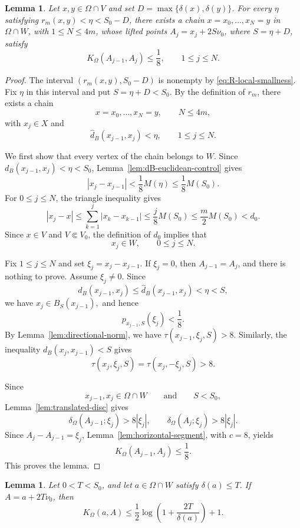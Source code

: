 \documentclass[11pt]{article}
\newtheorem{lemma}[theorem]{Lemma}
\theoremstyle{definition}
\begin{document}
\begin{lemma}\label{lem:chain-lifting}
	Let \(x,y\in\Omega\cap V\) and set
	\(D=\max\{\delta(x),\delta(y)\}\).
	For every \(\eta\) satisfying \(r_m(x,y)<\eta<S_0-D\), there exists
	a chain \(x=x_0,\ldots,x_N=y\) in \(\Omega\cap W\), with
	\(1\le N\le4m\), whose lifted points
	\(A_j=x_j+2S\nu_0\), where \(S=\eta+D\), satisfy
	\[
	K_\Omega(A_{j-1},A_j)\le\frac18,
	\qquad 1\le j\le N.
	\]
\end{lemma}

\begin{proof}
	The interval \((r_m(x,y),S_0-D)\) is nonempty by
	\eqref{eq:R-local-smallness}.  Fix \(\eta\) in this interval and
	put \(S=\eta+D<S_0\).
	By the definition of \(r_m\), there exists a chain
	\[
	x=x_0,\ldots,x_N=y,
	\qquad
	N\le4m,
	\]
	with \(x_j\in X\) and
	\[
	\widehat d_B(x_{j-1},x_j)<\eta,
	\qquad
	1\le j\le N.
	\]
	
	We first show that every vertex of the chain belongs to \(W\).
	Since
	\(d_B(x_{j-1},x_j) < \eta < S_0\),
	Lemma~\ref{lem:dB-euclidean-control} gives
	\[
	|x_j-x_{j-1}|
	<
	\frac18M(\eta)
	\le
	\frac18M(S_0).
	\]
	For \(0\le j\le N\), the triangle inequality gives
	\[
	|x_j-x|
	\le
	\sum_{k=1}^j|x_k-x_{k-1}|
	\le
	\frac{j}{8}M(S_0)
	\le
	\frac m2M(S_0)
	<
	d_0.
	\]
	Since \(x\in V\) and \(V\Subset V_0\), the definition of \(d_0\)
	implies that
	\[
	x_j\in W,
	\qquad
	0\le j\le N.
	\]
	
	Fix \(1\le j\le N\) and set
	\(
	\xi_j=x_j-x_{j-1}.
	\)
	If \(\xi_j=0\), then \(A_{j-1}=A_j\), and there is nothing to prove.
	Assume \(\xi_j\ne0\).
	Since
	\[
	d_B(x_{j-1},x_j)
	\le
	\widehat d_B(x_{j-1},x_j)
	<
	\eta
	<
	S,
	\]
	we have
	\(
	x_j\in B_S(x_{j-1}),
	\)
	and hence
	\[
	p_{x_{j-1},S}(\xi_j)<\frac18.
	\]
	By Lemma~\ref{lem:directional-norm}, we have
	\(\tau(x_{j-1},\xi_j,S)>8\).
	Similarly, the inequality
	\(d_B(x_j,x_{j-1})<S\)
	gives
	\[
	\tau(x_j,\xi_j,S)
	=
	\tau(x_j,-\xi_j,S)
	>
	8.
	\]
	
	Since
	\[
	x_{j-1},x_j\in\Omega\cap W
	\qquad\text{and}\qquad
	S<S_0,
	\]
	Lemma~\ref{lem:translated-disc} gives
	\[
	\delta_\Omega(A_{j-1};\xi_j)
	>
	8|\xi_j|,
	\qquad
	\delta_\Omega(A_j;\xi_j)
	>
	8|\xi_j|.
	\]
	Since
	\(A_j-A_{j-1}=\xi_j\),
	Lemma~\ref{lem:horizontal-segment}, with \(c=8\), yields
	\[
	K_\Omega(A_{j-1},A_j)\le\frac18.
	\]
	This proves the lemma.
\end{proof}

\begin{lemma}\label{lem:normal-leg}
Let \(0<T<S_0\), and let \(a\in\Omega\cap W\) satisfy
\(\delta(a)\le T\).  If \(A=a+2T\nu_0\), then
\begin{equation*}
K_\Omega(a,A)
\le
\frac12\log\left(1+\frac{2T}{\delta(a)}\right)+1.
\end{equation*}
\end{lemma}
\end{document}
